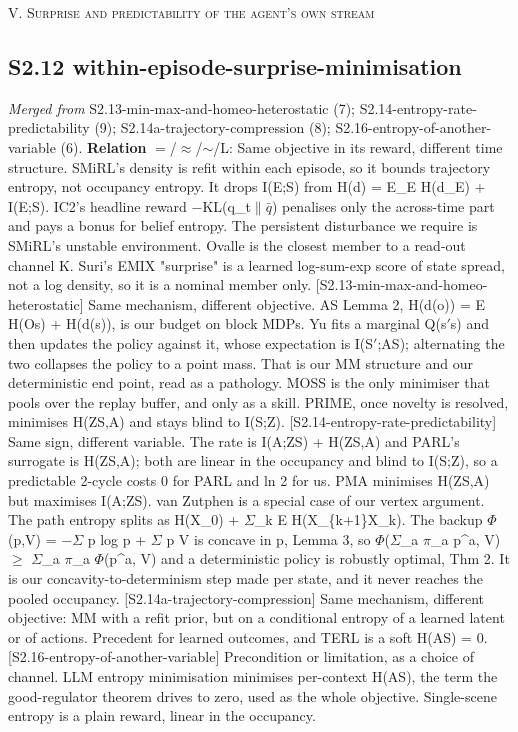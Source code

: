 \documentclass[10pt]{article}
\begin{document}
\medskip\textsc{V. Surprise and predictability of the agent's own stream}

\subsection{S2.12 within-episode-surprise-minimisation}\label{node:S2-S2-12-within-episode-surprise-minimisation}
\textit{Merged from} S2.13-min-max-and-homeo-heterostatic (7); S2.14-entropy-rate-predictability (9); S2.14a-trajectory-compression (8); S2.16-entropy-of-another-variable (6). \textbf{Relation} $=$/$\approx$/$\sim$/\textsf{L}: Same objective in its reward, different time structure. SMiRL's density is refit within each episode, so it bounds trajectory entropy, not occupancy entropy. It drops I(E;S) from H(d) = E\_E H(d\_E) + I(E;S). IC2's headline reward \ensuremath{-}KL(q\_t\ensuremath{\|}\ensuremath{\bar{q}}) penalises only the across-time part and pays a bonus for belief entropy. The persistent disturbance we require is SMiRL's unstable environment. Ovalle is the closest member to a read-out channel K. Suri's EMIX "surprise" is a learned log-sum-exp score of state spread, not a log density, so it is a nominal member only. [S2.13-min-max-and-homeo-heterostatic] Same mechanism, different objective. AS Lemma 2, H(d(o)) = E H(O\textbar{}s) + H(d(s)), is our budget on block MDPs. Yu fits a marginal Q(s\ensuremath{'}\textbar{}s) and then updates the policy against it, whose expectation is I(S\ensuremath{'};A\textbar{}S); alternating the two collapses the policy to a point mass. That is our MM structure and our deterministic end point, read as a pathology. MOSS is the only minimiser that pools over the replay buffer, and only as a skill. PRIME, once novelty is resolved, minimises H(Z\textbar{}S,A) and stays blind to I(S;Z). [S2.14-entropy-rate-predictability] Same sign, different variable. The rate is I(A;Z\textbar{}S) + H(Z\textbar{}S,A) and PARL's surrogate is H(Z\textbar{}S,A); both are linear in the occupancy and blind to I(S;Z), so a predictable 2-cycle costs 0 for PARL and ln 2 for us. PMA minimises H(Z\textbar{}S,A) but maximises I(A;Z\textbar{}S). van Zutphen is a special case of our vertex argument. The path entropy splits as H(X\_0) + \ensuremath{\Sigma}\_k E H(X\_\{k+1\}\textbar{}X\_k). The backup \ensuremath{\Phi}(p,V) = \ensuremath{-}\ensuremath{\Sigma} p log p + \ensuremath{\Sigma} p V is concave in p, Lemma 3, so \ensuremath{\Phi}(\ensuremath{\Sigma}\_a \ensuremath{\pi}\_a p\^{}a, V) \ensuremath{\geq} \ensuremath{\Sigma}\_a \ensuremath{\pi}\_a \ensuremath{\Phi}(p\^{}a, V) and a deterministic policy is robustly optimal, Thm 2. It is our concavity-to-determinism step made per state, and it never reaches the pooled occupancy. [S2.14a-trajectory-compression] Same mechanism, different objective: MM with a refit prior, but on a conditional entropy of a learned latent or of actions. Precedent for learned outcomes, and TERL is a soft H(A\textbar{}S) = 0. [S2.16-entropy-of-another-variable] Precondition or limitation, as a choice of channel. LLM entropy minimisation minimises per-context H(A\textbar{}S), the term the good-regulator theorem drives to zero, used as the whole objective. Single-scene entropy is a plain reward, linear in the occupancy.
\end{document}
